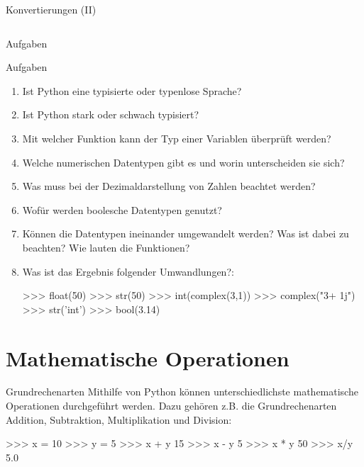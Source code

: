 \begin{frame}[fragile]{Konvertierungen (II)}
\begin{table}[]
{\begin{tabular}{|l|c|c|c|c|c|}
\cellcolor[HTML]{9AFF99}                                                                                                                                                         \\ \hline
\end{tabular}%
}
\end{table}
        \end{frame}
        
        \begin{subsection}{Aufgaben}
            \begin{frame}[fragile]{Aufgaben}
                \begin{enumerate}
                    \item Ist Python eine typisierte oder typenlose Sprache?
                    \item Ist Python stark oder schwach typisiert?
                    \item Mit welcher Funktion kann der Typ einer Variablen überprüft werden?
                    \item Welche numerischen Datentypen gibt es und worin unterscheiden sie sich?
                    \item Was muss bei der Dezimaldarstellung von Zahlen beachtet werden?
                    \item Wofür werden boolesche Datentypen genutzt?
                    \item Können die Datentypen ineinander umgewandelt werden? Was ist dabei zu beachten? Wie lauten die Funktionen?
                    \item Was ist das Ergebnis folgender Umwandlungen?:
\begin{pyconcode}
>>> float(50)
>>> str(50)
>>> int(complex(3,1))
>>> complex("3+ 1j")
>>> str('int')
>>> bool(3.14)
\end{pyconcode}                     
                \end{enumerate}
            \end{frame}
        \end{subsection}
    
    \section{Mathematische Operationen}
        
        \begin{frame}[fragile]{Grundrechenarten}
            Mithilfe von Python können unterschiedlichste mathematische Operationen durchgeführt werden. Dazu gehören z.B. die Grundrechenarten Addition, Subtraktion, Multiplikation und Division:
        
\begin{pyconcode}
>>> x = 10
>>> y = 5
>>> x + y
15
>>> x - y
5
>>> x * y
50
>>> x/y
5.0
\end{pyconcode}        
        \end{frame}
        
